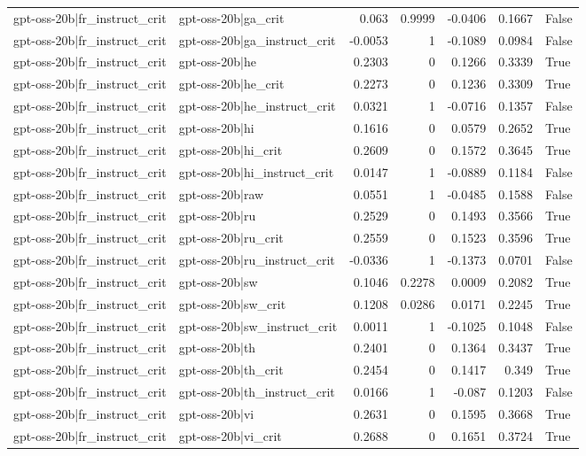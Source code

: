 \begin{table}
\begin{tabular}{l l r r r r l}
gpt-oss-20b|fr_instruct_crit & gpt-oss-20b|ga_crit & 0.063 & 0.9999 & -0.0406 & 0.1667 & False \\
gpt-oss-20b|fr_instruct_crit & gpt-oss-20b|ga_instruct_crit & -0.0053 & 1 & -0.1089 & 0.0984 & False \\
gpt-oss-20b|fr_instruct_crit & gpt-oss-20b|he & 0.2303 & 0 & 0.1266 & 0.3339 & True \\
gpt-oss-20b|fr_instruct_crit & gpt-oss-20b|he_crit & 0.2273 & 0 & 0.1236 & 0.3309 & True \\
gpt-oss-20b|fr_instruct_crit & gpt-oss-20b|he_instruct_crit & 0.0321 & 1 & -0.0716 & 0.1357 & False \\
gpt-oss-20b|fr_instruct_crit & gpt-oss-20b|hi & 0.1616 & 0 & 0.0579 & 0.2652 & True \\
gpt-oss-20b|fr_instruct_crit & gpt-oss-20b|hi_crit & 0.2609 & 0 & 0.1572 & 0.3645 & True \\
gpt-oss-20b|fr_instruct_crit & gpt-oss-20b|hi_instruct_crit & 0.0147 & 1 & -0.0889 & 0.1184 & False \\
gpt-oss-20b|fr_instruct_crit & gpt-oss-20b|raw & 0.0551 & 1 & -0.0485 & 0.1588 & False \\
gpt-oss-20b|fr_instruct_crit & gpt-oss-20b|ru & 0.2529 & 0 & 0.1493 & 0.3566 & True \\
gpt-oss-20b|fr_instruct_crit & gpt-oss-20b|ru_crit & 0.2559 & 0 & 0.1523 & 0.3596 & True \\
gpt-oss-20b|fr_instruct_crit & gpt-oss-20b|ru_instruct_crit & -0.0336 & 1 & -0.1373 & 0.0701 & False \\
gpt-oss-20b|fr_instruct_crit & gpt-oss-20b|sw & 0.1046 & 0.2278 & 0.0009 & 0.2082 & True \\
gpt-oss-20b|fr_instruct_crit & gpt-oss-20b|sw_crit & 0.1208 & 0.0286 & 0.0171 & 0.2245 & True \\
gpt-oss-20b|fr_instruct_crit & gpt-oss-20b|sw_instruct_crit & 0.0011 & 1 & -0.1025 & 0.1048 & False \\
gpt-oss-20b|fr_instruct_crit & gpt-oss-20b|th & 0.2401 & 0 & 0.1364 & 0.3437 & True \\
gpt-oss-20b|fr_instruct_crit & gpt-oss-20b|th_crit & 0.2454 & 0 & 0.1417 & 0.349 & True \\
gpt-oss-20b|fr_instruct_crit & gpt-oss-20b|th_instruct_crit & 0.0166 & 1 & -0.087 & 0.1203 & False \\
gpt-oss-20b|fr_instruct_crit & gpt-oss-20b|vi & 0.2631 & 0 & 0.1595 & 0.3668 & True \\
gpt-oss-20b|fr_instruct_crit & gpt-oss-20b|vi_crit & 0.2688 & 0 & 0.1651 & 0.3724 & True \\

\end{tabular}
\end{table}
